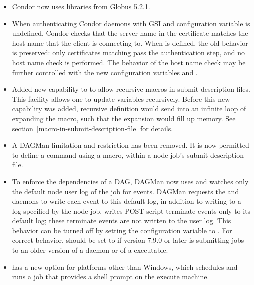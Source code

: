 \begin{itemize}
\item Condor now uses libraries from Globus 5.2.1.

\item When authenticating Condor daemons with GSI and
configuration variable  is undefined, 
Condor checks that the server name in the certificate matches the 
host name that the client is connecting to. 
When  is defined,
the old behavior is preserved: only certificates matching
 pass the authentication step, 
and no host name check is performed.  
The behavior of the host name check
may be further controlled with the new configuration variables
 and
.

\item Added new capability to  to allow recursive macros in
submit description files. 
This facility allows one to update variables recursively. 
Before this new capability was added,
recursive definition would send  into an
infinite loop of expanding the macro,
such that the expansion would fill up memory.
See section~\ref{macro-in-submit-description-file} for details.

\item A DAGMan limitation and restriction has been removed.  
It is now permitted to define a  command using a macro,
within a node job's submit description file.

\item To enforce the dependencies of a DAG,
DAGMan now uses and watches only the default node
user log of the  job for events.  
DAGMan requests the  and  daemons to write each
event to this default log, 
in addition to writing to a log specified by the node job.
 writes POST script terminate events only to its default log;
these terminate events are not written to the user log.
This behavior can be turned off by setting the configuration variable
 to .
For correct behavior,
 should be set to 
if  version 7.9.0 or later is submitting jobs 
to an older version of
a  daemon or of a  executable.

\item {} has a new  option for
platforms other than Windows,
which schedules and runs a job that provides a shell prompt
on the execute machine.

\end{itemize}

